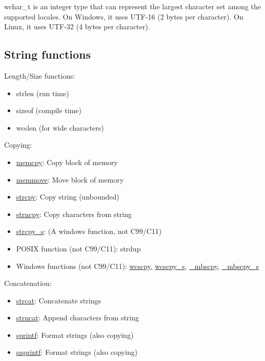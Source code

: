 \documentclass[letterpaper]{article}
\begin{document}
wchar\_t is an integer type that can represent the largest character set among the supported locales. On Windows, it uses UTF-16 (2 bytes per character). On Linux, it uses UTF-32 (4 bytes per character).

\subsection{String functions}
Length/Size functions:
\begin{itemize}
\item strlen (run time)
\item sizeof (compile time)
\item wcslen (for wide characters)
\end{itemize}

Copying:
\begin{itemize}
\item \href{http://www.cplusplus.com/reference/cstring/memcpy/}{memcpy}: Copy block of memory 
\item \href{http://www.cplusplus.com/reference/cstring/memmove/}{memmove}: Move block of memory 
\item \href{http://www.cplusplus.com/reference/cstring/strcpy/}{strcpy}: Copy string (unbounded)
\item \href{http://www.cplusplus.com/reference/cstring/strncpy/}{strncpy}: Copy characters from string 
\item \href{https://msdn.microsoft.com/en-us/library/td1esda9.aspx}{strcpy\_s}: (A windows function, not C99/C11)
\item POSIX function (not C99/C11): strdup
\item Windows functions (not C99/C11): \href{https://msdn.microsoft.com/en-us/library/kk6xf663.aspx}{wcscpy}, \href{https://msdn.microsoft.com/en-us/library/td1esda9.aspx}{wcscpy\_s}, \href{https://msdn.microsoft.com/en-us/library/kk6xf663.aspx}{\_mbscpy}, \href{https://msdn.microsoft.com/en-us/library/td1esda9.aspx}{\_mbscpy\_s}
\end{itemize}

Concatenation:
\begin{itemize}
\item \href{http://www.cplusplus.com/reference/cstring/strcat/}{strcat}: Concatenate strings
\item \href{http://www.cplusplus.com/reference/cstring/strncat/}{strncat}: Append characters from string
\item \href{http://www.cplusplus.com/reference/cstdio/sprintf/}{sprintf}: Format strings (also copying)
\item \href{http://www.cplusplus.com/reference/cstdio/snprintf/}{snprintf}: Format strings (also copying)
\end{itemize}
\end{document}
